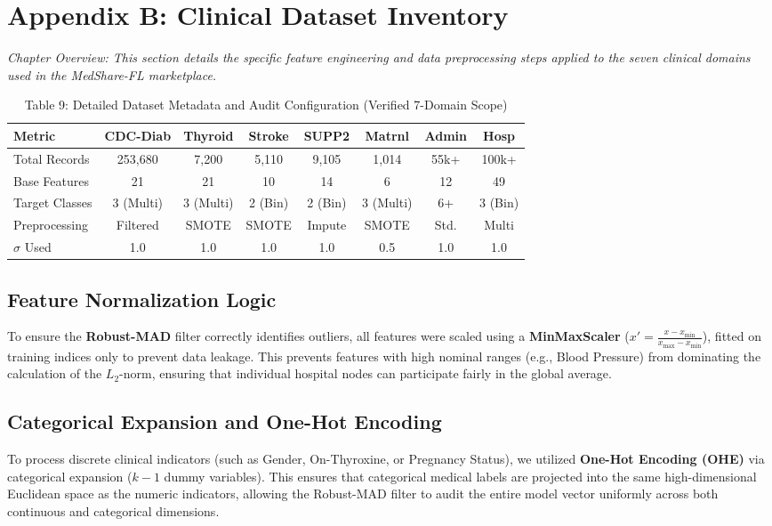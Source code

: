 \documentclass[10pt, a4paper, twocolumn]{article}
\begin{document}
\section*{Appendix B: Clinical Dataset Inventory}

\textit{Chapter Overview: This section details the specific feature engineering and data preprocessing steps applied to the seven clinical domains \cite{cdc2015, uci-thyroid, knaus1995, stroke2022} used in the MedShare-FL marketplace.}

\begin{table}[hbt!]
\centering
\scriptsize
\begin{tabular}{lccccccc}
\toprule
\textbf{Metric} & \textbf{CDC-Diab} & \textbf{Thyroid} & \textbf{Stroke} & \textbf{SUPP2} & \textbf{Matrnl} & \textbf{Admin} & \textbf{Hosp} \\
\midrule
Total Records & 253,680 & 7,200 & 5,110 & 9,105 & 1,014 & 55k+ & 100k+ \\
Base Features & 21 & 21 & 10 & 14 & 6 & 12 & 49 \\
Target Classes & 3 (Multi) & 3 (Multi) & 2 (Bin) & 2 (Bin) & 3 (Multi) & 6+ & 3 (Bin) \\
Preprocessing & Filtered & SMOTE & SMOTE & Impute & SMOTE & Std. & Multi \\
$\sigma$ Used & 1.0 & 1.0 & 1.0 & 1.0 & 0.5 & 1.0 & 1.0 \\
\bottomrule
\end{tabular}
\caption{Table 9: Detailed Dataset Metadata and Audit Configuration (Verified 7-Domain Scope)}
\end{table}

\subsection*{Feature Normalization Logic}
To ensure the \textbf{Robust-MAD} filter correctly identifies outliers, all features were scaled using a \textbf{MinMaxScaler} ($x' = \frac{x - x_{\min}}{x_{\max} - x_{\min}}$), fitted on training indices only to prevent data leakage. This prevents features with high nominal ranges (e.g., Blood Pressure) from dominating the calculation of the $L_2$-norm, ensuring that individual hospital nodes can participate fairly in the global average.

\subsection*{Categorical Expansion and One-Hot Encoding}
To process discrete clinical indicators (such as Gender, On-Thyroxine, or Pregnancy Status), we utilized \textbf{One-Hot Encoding (OHE)} via categorical expansion ($k-1$ dummy variables). This ensures that categorical medical labels are projected into the same high-dimensional Euclidean space as the numeric indicators, allowing the Robust-MAD filter to audit the entire model vector uniformly across both continuous and categorical dimensions.
\end{document}
